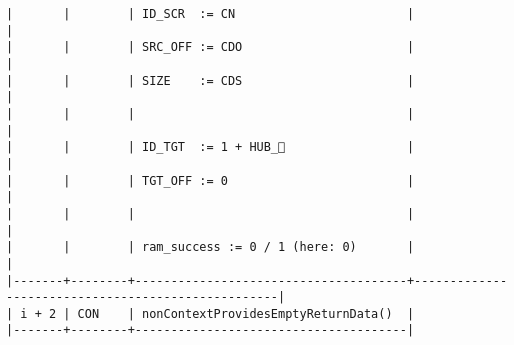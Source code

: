 \documentclass[varwidth=\maxdimen,margin=0.5cm,multi={verbatim}]{standalone}
\begin{document}
\begin{verbatim}
|       |        | ID_SCR  := CN                        |                                                   |
|       |        | SRC_OFF := CDO                       |                                                   |
|       |        | SIZE    := CDS                       |                                                   |
|       |        |                                      |                                                   |
|       |        | ID_TGT  := 1 + HUB_                 |                                                   |
|       |        | TGT_OFF := 0                         |                                                   |
|       |        |                                      |                                                   |
|       |        | ram_success := 0 / 1 (here: 0)       |                                                   |
|-------+--------+--------------------------------------+---------------------------------------------------|
| i + 2 | CON    | nonContextProvidesEmptyReturnData()  |
|-------+--------+--------------------------------------|
\end{verbatim}
\end{document}
